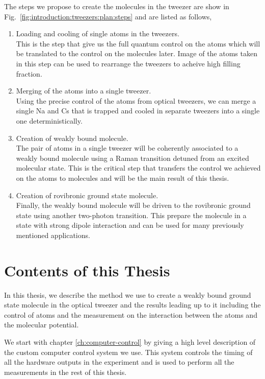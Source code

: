 The steps we propose to create the molecules in the tweezer are show in
Fig.~\ref{fig:introduction:tweezers:plan:steps} and are listed as follows,
\begin{enumerate}
\item Loading and cooling of single atoms in the tweezers.\\
  This is the step that give us the full quantum control on the atoms
  which will be translated to the control on the molecules later.
  Image of the atoms taken in this step can be used to rearrange the tweezers
  to acheive high filling fraction.
\item Merging of the atoms into a single tweezer.\\
  Using the precise control of the atoms from optical tweezers,
  we can merge a single Na and Cs that is trapped and cooled in separate tweezers
  into a single one deterministically.
\item Creation of weakly bound molecule.\\
  The pair of atoms in a single tweezer will be coherently associated
  to a weakly bound molecule using a Raman transition detuned from an excited molecular state.
  This is the critical step that transfers the control we achieved
  on the atoms to molecules and will be the main result of this thesis.
\item Creation of rovibronic ground state molecule.\\
  Finally, the weakly bound molecule will be driven to the rovibronic ground state
  using another two-photon transition.
  This prepare the molecule in a state with strong dipole interaction
  and can be used for many previously mentioned applications.
\end{enumerate}

\section{Contents of this Thesis}
\label{ch:introduction:contents}

In this thesis, we describe the method we use to create a weakly bound ground state molecule
in the optical tweezer and the results leading up to it including the control of atoms
and the measurement on the interaction between the atoms and the molecular potential.

We start with chapter \ref{ch:computer-control} by giving a high level description of
the custom computer control system we use.
This system controls the timing of all the hardware outputs in the experiment
and is used to perform all the measurements in the rest of this thesis.

